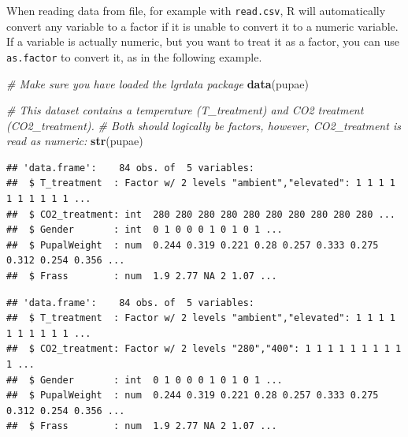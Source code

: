 \documentclass[]{book}
\newenvironment{Shaded}{\begin{snugshade}}{\end{snugshade}}
\newcommand{\CommentTok}[1]{\textcolor[rgb]{0.56,0.35,0.01}{\textit{#1}}}
\newcommand{\KeywordTok}[1]{\textcolor[rgb]{0.13,0.29,0.53}{\textbf{#1}}}
\newcommand{\NormalTok}[1]{#1}
\newcommand{\OperatorTok}[1]{\textcolor[rgb]{0.81,0.36,0.00}{\textbf{#1}}}
\newcommand{\StringTok}[1]{\textcolor[rgb]{0.31,0.60,0.02}{#1}}
\begin{document}
When reading data from file, for example with \texttt{read.csv}, R will automatically convert any variable to a factor if it is unable to convert it to a numeric variable. If a variable is actually numeric, but you want to treat it as a factor, you can use \texttt{as.factor} to convert it, as in the following example.

\begin{Shaded}
\begin{Highlighting}[]
\CommentTok{# Make sure you have loaded the lgrdata package}
\KeywordTok{data}\NormalTok{(pupae)}

\CommentTok{# This dataset contains a temperature (T_treatment) and CO2 treatment (CO2_treatment).}
\CommentTok{# Both should logically be factors, however, CO2_treatment is read as numeric:}
\KeywordTok{str}\NormalTok{(pupae)}
\end{Highlighting}
\end{Shaded}

\begin{verbatim}
## 'data.frame':    84 obs. of  5 variables:
##  $ T_treatment  : Factor w/ 2 levels "ambient","elevated": 1 1 1 1 1 1 1 1 1 1 ...
##  $ CO2_treatment: int  280 280 280 280 280 280 280 280 280 280 ...
##  $ Gender       : int  0 1 0 0 0 1 0 1 0 1 ...
##  $ PupalWeight  : num  0.244 0.319 0.221 0.28 0.257 0.333 0.275 0.312 0.254 0.356 ...
##  $ Frass        : num  1.9 2.77 NA 2 1.07 ...
\end{verbatim}

\begin{Shaded}
\end{Shaded}

\begin{verbatim}
## 'data.frame':    84 obs. of  5 variables:
##  $ T_treatment  : Factor w/ 2 levels "ambient","elevated": 1 1 1 1 1 1 1 1 1 1 ...
##  $ CO2_treatment: Factor w/ 2 levels "280","400": 1 1 1 1 1 1 1 1 1 1 ...
##  $ Gender       : int  0 1 0 0 0 1 0 1 0 1 ...
##  $ PupalWeight  : num  0.244 0.319 0.221 0.28 0.257 0.333 0.275 0.312 0.254 0.356 ...
##  $ Frass        : num  1.9 2.77 NA 2 1.07 ...
\end{verbatim}
\end{document}
